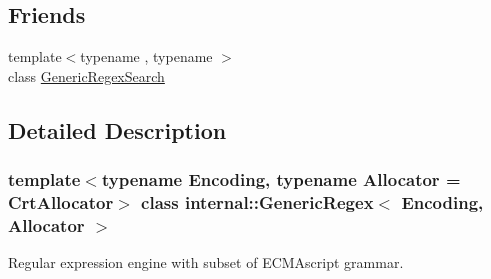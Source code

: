 \subsection*{Friends}
\begin{DoxyCompactItemize}
\item 
{\footnotesize template$<$typename , typename $>$ }\\class \hyperlink{classinternal_1_1GenericRegex_a919008cc046ab9f1c09609f1fc143986}{Generic\+Regex\+Search}
\end{DoxyCompactItemize}


\subsection{Detailed Description}
\subsubsection*{template$<$typename Encoding, typename Allocator = Crt\+Allocator$>$\newline
class internal\+::\+Generic\+Regex$<$ Encoding, Allocator $>$}

Regular expression engine with subset of E\+C\+M\+Ascript grammar. 

